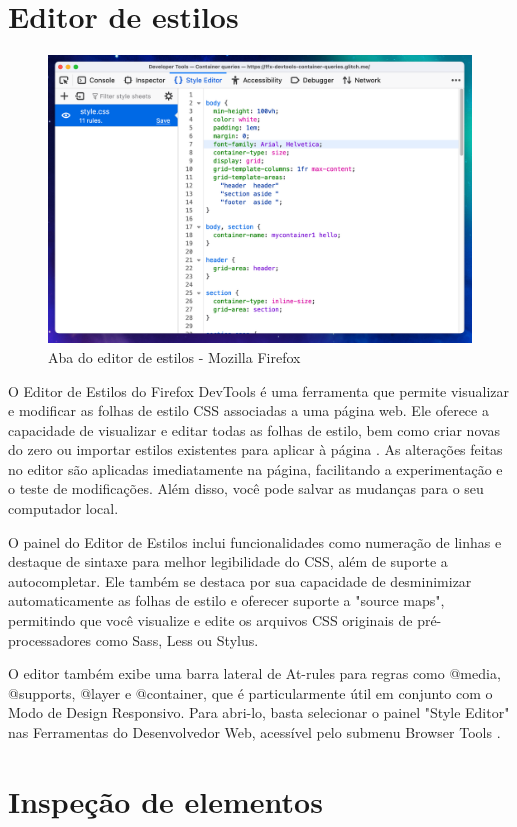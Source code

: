 \section{Editor de estilos}
\begin{figure}[h!]
    \centering
    \includegraphics[width=0.7\linewidth]{assets/tools/firefox-style.png}
    \caption{Aba do editor de estilos - Mozilla Firefox }
    \label{fig:enter-label}
\end{figure}
O Editor de Estilos do Firefox DevTools é uma ferramenta que permite visualizar e modificar as folhas de estilo CSS associadas a uma página web. Ele oferece a capacidade de visualizar e editar todas as folhas de estilo, bem como criar novas do zero ou importar estilos existentes para aplicar à página \cite{firefox}. As alterações feitas no editor são aplicadas imediatamente na página, facilitando a experimentação e o teste de modificações. Além disso, você pode salvar as mudanças para o seu computador local.

O painel do Editor de Estilos inclui funcionalidades como numeração de linhas e destaque de sintaxe para melhor legibilidade do CSS, além de suporte a autocompletar. Ele também se destaca por sua capacidade de desminimizar automaticamente as folhas de estilo e oferecer suporte a "source maps", permitindo que você visualize e edite os arquivos CSS originais de pré-processadores como Sass, Less ou Stylus\cite{firefox}. 

O editor também exibe uma barra lateral de At-rules para regras como @media, @supports, @layer e @container, que é particularmente útil em conjunto com o Modo de Design Responsivo. Para abri-lo, basta selecionar o painel "Style Editor" nas Ferramentas do Desenvolvedor Web, acessível pelo submenu Browser Tools \cite{firefox}.

\section{Inspeção de elementos}

